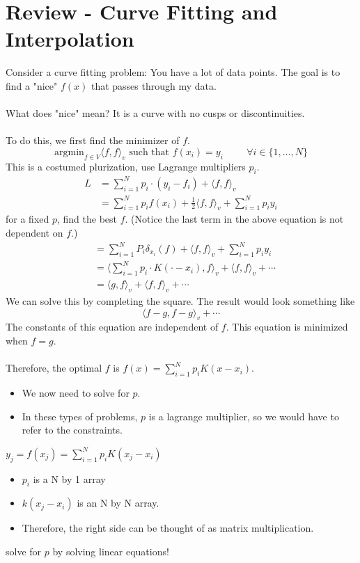 \documentclass[10pt]{article}
\begin{document}
\section*{Review - Curve Fitting and Interpolation}
Consider a curve fitting problem:  You have a lot of data points.  The goal is to find a "nice" $f(x)$ that passes through my data.\\\\ 
What does "nice" mean?  It is a curve with no cusps or discontinuities.\\\\
To do this, we first find the minimizer of $f$.
\[\text{argmin}_{f \in V} \langle f, f\rangle_v \text{ such that } f(x_i) = y_i \hspace{1cm} \forall i \in \{1, \dots, N\}\]
This is a costumed plurization, use Lagrange multipliers $p_i$.
\begin{align*}
    L &= \sum_{i = 1}^N p_i \cdot (y_i - f_i) + \langle f, f \rangle_v\\
    &= \sum_{i = 1}^N p_i f(x_i) + \frac{1}{2}\langle f, f \rangle_v + \sum_{i = 1}^N p_i y_i
\end{align*}
for a fixed $p$, find the best $f$.  (Notice the last term in the above equation is not dependent on $f$.)
\begin{align*}
    &= \sum_{i = 1}^N P_i \delta_{x_i} (f) + \langle f, f \rangle_v + \sum_{i = 1}^N p_i y_i\\
    &= \langle \sum_{i = 1}^N p_i \cdot K(\cdot - x_i), f \rangle_v + \langle f, f \rangle_v + \cdots\\
    &= \langle g, f \rangle_v + \langle f, f \rangle_v + \cdots
\end{align*}
We can solve this by completing the square.  The result would look something like
\[\langle f - g, f - g \rangle_v + \cdots\]
The constants of this equation are independent of $f$.  This equation is minimized when $f = g$.\\\\
Therefore, the optimal $f$ is $f(x) = \sum_{i = 1}^N p_i K(x - x_i)$.
\begin{itemize}
    \item We now need to solve for $p$.
    \item In these types of problems, $p$ is a lagrange multiplier, so we would have to refer to the constraints.
\end{itemize}
$y_{j} = f(x_j) = \sum_{i = 1}^N p_i K(x_j - x_i)$
\begin{itemize}
    \item $p_i$ is a N by 1 array
    \item $k(x_j - x_i)$ is an N by N array.
    \item Therefore, the right side can be thought of as matrix multiplication.
\end{itemize}
solve for $p$ by solving linear equations!
\end{document}
